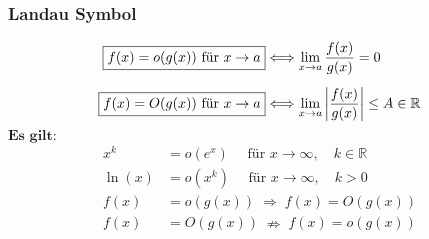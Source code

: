 \subsubsection{Landau Symbol}
    \vspace{-1em}
    \begin{align*}
        \fbox{$f(x) = o(g(x)) \textrm{ für } x \to a$} &\Longleftrightarrow \lim_{x \to a} \frac{f(x)}{g(x)} = 0\\[0.5em]
        \fbox{$f(x) = O(g(x)) \textrm{ für } x \to a$}  &\Longleftrightarrow \lim_{x \to a} \left\lvert\frac{f(x)}{g(x)}\right\rvert \leq A \in \mathbb{R}
    \end{align*}
    $\textbf{Es gilt:}$
        \begin{align*}
            x^k &= o(e^x) \quad \textrm{ für } x \to \infty, \quad k \in \mathbb{R}\\
            \ln(x) &= o(x^k) \quad \textrm{ für } x \to \infty, \quad k > 0\\[0.5em]
            f(x) &= o(g(x)) \; \Rightarrow \; f(x) = O(g(x))\\
        f(x) &= O(g(x)) \; \nRightarrow \; f(x) = o(g(x))
        \end{align*}